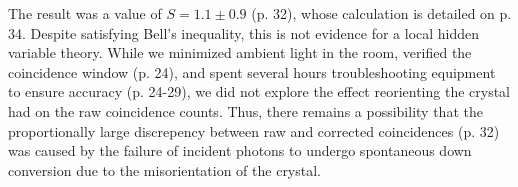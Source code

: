 \documentclass[11pt]{article}
\begin{document}
The result was a value of $S=1.1\pm 0.9$ (p. 32), whose calculation is detailed on p. 34. Despite satisfying Bell's inequality, 
this is not evidence for a local hidden variable theory. While we minimized ambient light in the room,
verified the coincidence window (p. 24), and spent several hours troubleshooting equipment to ensure accuracy (p. 24-29), 
we did not explore the effect reorienting the crystal had on the raw coincidence counts.
Thus, there remains a possibility that the proportionally large discrepency between raw and corrected coincidences (p. 32) was 
caused by the failure of incident photons to undergo spontaneous down conversion due to the misorientation of the crystal.
\end{document}
